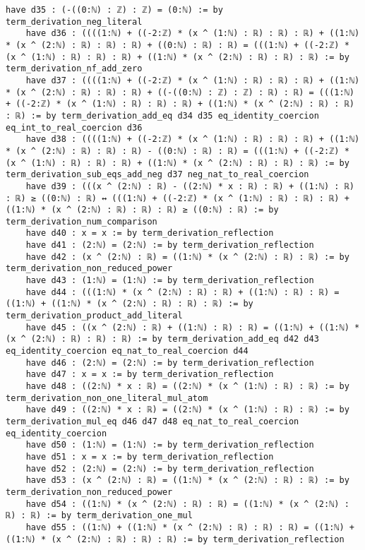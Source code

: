 \documentclass{article}
\begin{document}
\begin{tcolorbox}[colback=white!10, width=\linewidth]
\begin{lstlisting}[language=Lean4]
    have d35 : (-((0:ℕ) : ℤ) : ℤ) = (0:ℕ) := by term_derivation_neg_literal
    have d36 : ((((1:ℕ) + ((-2:ℤ) * (x ^ (1:ℕ) : ℝ) : ℝ) : ℝ) + ((1:ℕ) * (x ^ (2:ℕ) : ℝ) : ℝ) : ℝ) + ((0:ℕ) : ℝ) : ℝ) = (((1:ℕ) + ((-2:ℤ) * (x ^ (1:ℕ) : ℝ) : ℝ) : ℝ) + ((1:ℕ) * (x ^ (2:ℕ) : ℝ) : ℝ) : ℝ) := by term_derivation_nf_add_zero
    have d37 : ((((1:ℕ) + ((-2:ℤ) * (x ^ (1:ℕ) : ℝ) : ℝ) : ℝ) + ((1:ℕ) * (x ^ (2:ℕ) : ℝ) : ℝ) : ℝ) + ((-((0:ℕ) : ℤ) : ℤ) : ℝ) : ℝ) = (((1:ℕ) + ((-2:ℤ) * (x ^ (1:ℕ) : ℝ) : ℝ) : ℝ) + ((1:ℕ) * (x ^ (2:ℕ) : ℝ) : ℝ) : ℝ) := by term_derivation_add_eq d34 d35 eq_identity_coercion eq_int_to_real_coercion d36
    have d38 : ((((1:ℕ) + ((-2:ℤ) * (x ^ (1:ℕ) : ℝ) : ℝ) : ℝ) + ((1:ℕ) * (x ^ (2:ℕ) : ℝ) : ℝ) : ℝ) - ((0:ℕ) : ℝ) : ℝ) = (((1:ℕ) + ((-2:ℤ) * (x ^ (1:ℕ) : ℝ) : ℝ) : ℝ) + ((1:ℕ) * (x ^ (2:ℕ) : ℝ) : ℝ) : ℝ) := by term_derivation_sub_eqs_add_neg d37 neg_nat_to_real_coercion
    have d39 : (((x ^ (2:ℕ) : ℝ) - ((2:ℕ) * x : ℝ) : ℝ) + ((1:ℕ) : ℝ) : ℝ) ≥ ((0:ℕ) : ℝ) ↔ (((1:ℕ) + ((-2:ℤ) * (x ^ (1:ℕ) : ℝ) : ℝ) : ℝ) + ((1:ℕ) * (x ^ (2:ℕ) : ℝ) : ℝ) : ℝ) ≥ ((0:ℕ) : ℝ) := by term_derivation_num_comparison
    have d40 : x = x := by term_derivation_reflection
    have d41 : (2:ℕ) = (2:ℕ) := by term_derivation_reflection
    have d42 : (x ^ (2:ℕ) : ℝ) = ((1:ℕ) * (x ^ (2:ℕ) : ℝ) : ℝ) := by term_derivation_non_reduced_power
    have d43 : (1:ℕ) = (1:ℕ) := by term_derivation_reflection
    have d44 : (((1:ℕ) * (x ^ (2:ℕ) : ℝ) : ℝ) + ((1:ℕ) : ℝ) : ℝ) = ((1:ℕ) + ((1:ℕ) * (x ^ (2:ℕ) : ℝ) : ℝ) : ℝ) := by term_derivation_product_add_literal
    have d45 : ((x ^ (2:ℕ) : ℝ) + ((1:ℕ) : ℝ) : ℝ) = ((1:ℕ) + ((1:ℕ) * (x ^ (2:ℕ) : ℝ) : ℝ) : ℝ) := by term_derivation_add_eq d42 d43 eq_identity_coercion eq_nat_to_real_coercion d44
    have d46 : (2:ℕ) = (2:ℕ) := by term_derivation_reflection
    have d47 : x = x := by term_derivation_reflection
    have d48 : ((2:ℕ) * x : ℝ) = ((2:ℕ) * (x ^ (1:ℕ) : ℝ) : ℝ) := by term_derivation_non_one_literal_mul_atom
    have d49 : ((2:ℕ) * x : ℝ) = ((2:ℕ) * (x ^ (1:ℕ) : ℝ) : ℝ) := by term_derivation_mul_eq d46 d47 d48 eq_nat_to_real_coercion eq_identity_coercion
    have d50 : (1:ℕ) = (1:ℕ) := by term_derivation_reflection
    have d51 : x = x := by term_derivation_reflection
    have d52 : (2:ℕ) = (2:ℕ) := by term_derivation_reflection
    have d53 : (x ^ (2:ℕ) : ℝ) = ((1:ℕ) * (x ^ (2:ℕ) : ℝ) : ℝ) := by term_derivation_non_reduced_power
    have d54 : ((1:ℕ) * (x ^ (2:ℕ) : ℝ) : ℝ) = ((1:ℕ) * (x ^ (2:ℕ) : ℝ) : ℝ) := by term_derivation_one_mul
    have d55 : ((1:ℕ) + ((1:ℕ) * (x ^ (2:ℕ) : ℝ) : ℝ) : ℝ) = ((1:ℕ) + ((1:ℕ) * (x ^ (2:ℕ) : ℝ) : ℝ) : ℝ) := by term_derivation_reflection

\end{lstlisting}
\end{tcolorbox}
\end{document}
